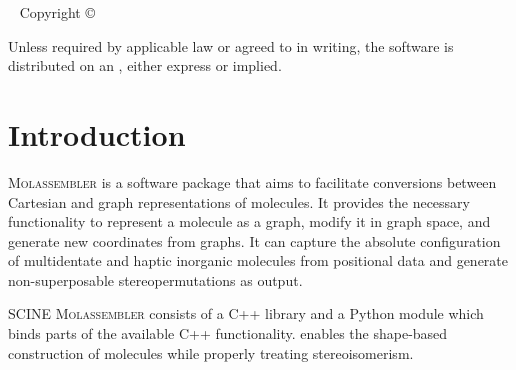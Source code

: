 \documentclass[]{tufte-book}
\title[SCINE Molassembler manual]{User Manual \vskip 0.5em
{\setlength{\parindent}{0pt} \Huge SCINE Molassembler 1.0.0}}
\author[The SCINE Molassembler Developers]{The SCINE Molassembler Developers:
\newline \noindent Jan-Grimo Sobez and Markus Reiher}
\newcommand{\monthyear}{%
  \ifcase\month\or January\or February\or March\or April\or May\or June\or
  July\or August\or September\or October\or November\or
  December\fi\space\number\year
}
\begin{document}
\setlength{\parindent}{0pt}

\frontmatter


\maketitle


\newpage
\begin{fullwidth}
~\vfill
\thispagestyle{empty}
\setlength{\parindent}{0pt}
\setlength{\parskip}{\baselineskip}
Copyright \copyright\ \the\year\ \thanklessauthor


\par{}

\par Unless required by applicable law or agreed to in writing, the software 
is distributed on an , either express or implied. 

\end{fullwidth}

\tableofcontents




\mainmatter

\let\cleardoublepage\clearpage
\chapter{Introduction}

\textsc{Molassembler} is a software package that aims to facilitate conversions
between Cartesian and graph representations of molecules. It provides the
necessary functionality to represent a molecule as a graph, modify it in graph
space, and generate new coordinates from graphs. It can capture the absolute
configuration of multidentate and haptic inorganic molecules from positional
data and generate non-superposable stereopermutations as output.

SCINE \textsc{Molassembler} consists of a C++ library and a Python module which
binds parts of the available C++ functionality.  enables the
shape-based construction of molecules while properly treating stereoisomerism.
\end{document}
